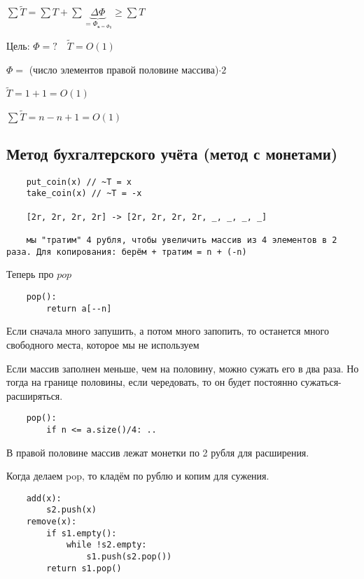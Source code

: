 \documentclass{book}
\theoremstyle{definition}
\begin{document}
 $\sum \widetilde T = \sum T + \sum \underbrace{\Delta\Phi}\limits_{=\Phi_{\text{к}=\Phi_0}} \geqslant \sum T$

 Цель: $\Phi = ?\quad \widetilde T = O(1)$

 $\Phi=$ (число элементов правой половине массива)$\cdot 2$

 $\widetilde T = 1 +1 = O(1)$

 $\sum \widetilde T = n-n+1 = O(1)$

\subsection{Метод бухгалтерского учёта (метод с монетами)}
\begin{verbatim}
    put_coin(x) // ~T = x
    take_coin(x) // ~T = -x

    [2r, 2r, 2r, 2r] -> [2r, 2r, 2r, 2r, _, _, _, _]

    мы "тратим" 4 рубля, чтобы увеличить массив из 4 элементов в 2 раза. Для копирования: берём + тратим = n + (-n)  

\end{verbatim}

Теперь про $pop$

 \begin{verbatim}
    pop():
        return a[--n]
\end{verbatim}

Если сначала много запушить, а потом много запопить, то останется много свободного места, которое мы не используем

Если массив заполнен меньше, чем на половину, можно сужать его в два раза. Но тогда на границе половины, если чередовать, то он будет постоянно сужаться-расширяться.

\begin{verbatim}
    pop():
        if n <= a.size()/4: ..
\end{verbatim}

В правой половине массив лежат монетки по 2 рубля для расширения.

Когда делаем pop, то кладём по рублю и копим для сужения. 

\begin{verbatim}
    add(x):
        s2.push(x)
    remove(x):
        if s1.empty():
            while !s2.empty:
                s1.push(s2.pop())
        return s1.pop()
\end{verbatim}
\end{document}
